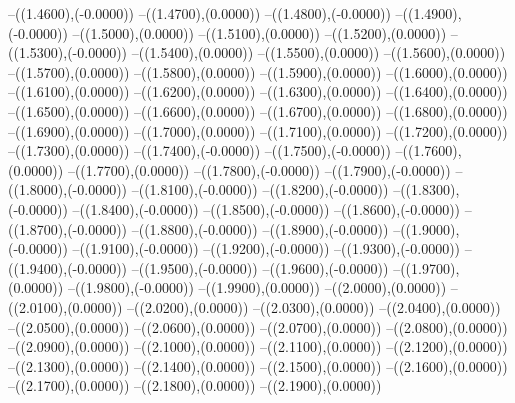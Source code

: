 {	--({\sx*(1.4600)},{\sy*(-0.0000)})
	--({\sx*(1.4700)},{\sy*(0.0000)})
	--({\sx*(1.4800)},{\sy*(-0.0000)})
	--({\sx*(1.4900)},{\sy*(-0.0000)})
	--({\sx*(1.5000)},{\sy*(0.0000)})
	--({\sx*(1.5100)},{\sy*(0.0000)})
	--({\sx*(1.5200)},{\sy*(0.0000)})
	--({\sx*(1.5300)},{\sy*(-0.0000)})
	--({\sx*(1.5400)},{\sy*(0.0000)})
	--({\sx*(1.5500)},{\sy*(0.0000)})
	--({\sx*(1.5600)},{\sy*(0.0000)})
	--({\sx*(1.5700)},{\sy*(0.0000)})
	--({\sx*(1.5800)},{\sy*(0.0000)})
	--({\sx*(1.5900)},{\sy*(0.0000)})
	--({\sx*(1.6000)},{\sy*(0.0000)})
	--({\sx*(1.6100)},{\sy*(0.0000)})
	--({\sx*(1.6200)},{\sy*(0.0000)})
	--({\sx*(1.6300)},{\sy*(0.0000)})
	--({\sx*(1.6400)},{\sy*(0.0000)})
	--({\sx*(1.6500)},{\sy*(0.0000)})
	--({\sx*(1.6600)},{\sy*(0.0000)})
	--({\sx*(1.6700)},{\sy*(0.0000)})
	--({\sx*(1.6800)},{\sy*(0.0000)})
	--({\sx*(1.6900)},{\sy*(0.0000)})
	--({\sx*(1.7000)},{\sy*(0.0000)})
	--({\sx*(1.7100)},{\sy*(0.0000)})
	--({\sx*(1.7200)},{\sy*(0.0000)})
	--({\sx*(1.7300)},{\sy*(0.0000)})
	--({\sx*(1.7400)},{\sy*(-0.0000)})
	--({\sx*(1.7500)},{\sy*(-0.0000)})
	--({\sx*(1.7600)},{\sy*(0.0000)})
	--({\sx*(1.7700)},{\sy*(0.0000)})
	--({\sx*(1.7800)},{\sy*(-0.0000)})
	--({\sx*(1.7900)},{\sy*(-0.0000)})
	--({\sx*(1.8000)},{\sy*(-0.0000)})
	--({\sx*(1.8100)},{\sy*(-0.0000)})
	--({\sx*(1.8200)},{\sy*(-0.0000)})
	--({\sx*(1.8300)},{\sy*(-0.0000)})
	--({\sx*(1.8400)},{\sy*(-0.0000)})
	--({\sx*(1.8500)},{\sy*(-0.0000)})
	--({\sx*(1.8600)},{\sy*(-0.0000)})
	--({\sx*(1.8700)},{\sy*(-0.0000)})
	--({\sx*(1.8800)},{\sy*(-0.0000)})
	--({\sx*(1.8900)},{\sy*(-0.0000)})
	--({\sx*(1.9000)},{\sy*(-0.0000)})
	--({\sx*(1.9100)},{\sy*(-0.0000)})
	--({\sx*(1.9200)},{\sy*(-0.0000)})
	--({\sx*(1.9300)},{\sy*(-0.0000)})
	--({\sx*(1.9400)},{\sy*(-0.0000)})
	--({\sx*(1.9500)},{\sy*(-0.0000)})
	--({\sx*(1.9600)},{\sy*(-0.0000)})
	--({\sx*(1.9700)},{\sy*(0.0000)})
	--({\sx*(1.9800)},{\sy*(-0.0000)})
	--({\sx*(1.9900)},{\sy*(0.0000)})
	--({\sx*(2.0000)},{\sy*(0.0000)})
	--({\sx*(2.0100)},{\sy*(0.0000)})
	--({\sx*(2.0200)},{\sy*(0.0000)})
	--({\sx*(2.0300)},{\sy*(0.0000)})
	--({\sx*(2.0400)},{\sy*(0.0000)})
	--({\sx*(2.0500)},{\sy*(0.0000)})
	--({\sx*(2.0600)},{\sy*(0.0000)})
	--({\sx*(2.0700)},{\sy*(0.0000)})
	--({\sx*(2.0800)},{\sy*(0.0000)})
	--({\sx*(2.0900)},{\sy*(0.0000)})
	--({\sx*(2.1000)},{\sy*(0.0000)})
	--({\sx*(2.1100)},{\sy*(0.0000)})
	--({\sx*(2.1200)},{\sy*(0.0000)})
	--({\sx*(2.1300)},{\sy*(0.0000)})
	--({\sx*(2.1400)},{\sy*(0.0000)})
	--({\sx*(2.1500)},{\sy*(0.0000)})
	--({\sx*(2.1600)},{\sy*(0.0000)})
	--({\sx*(2.1700)},{\sy*(0.0000)})
	--({\sx*(2.1800)},{\sy*(0.0000)})
	--({\sx*(2.1900)},{\sy*(0.0000)})
}
